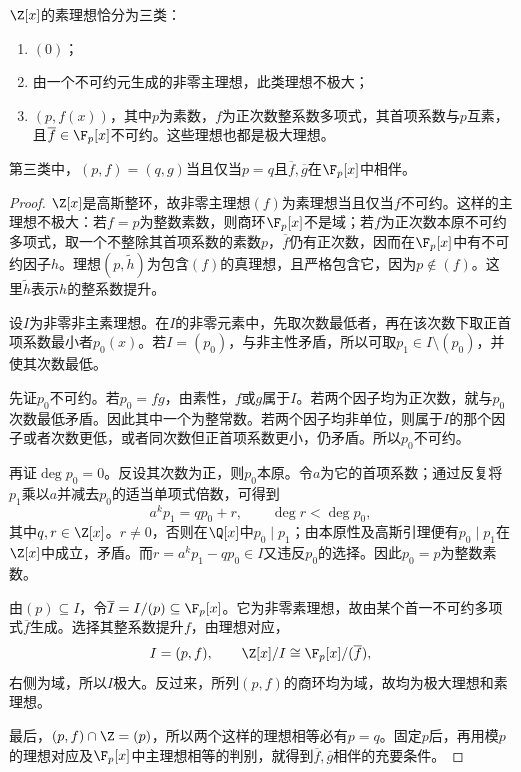 \begin{theorem}\label{p2:z-polynomial-primes}
$\Z[x]$的素理想恰分为三类：
\begin{enumerate}
\item $(0)$；
\item 由一个不可约元生成的非零主理想，此类理想不极大；
\item $(p,f(x))$，其中$p$为素数，$f$为正次数整系数多项式，其首项系数与$p$互素，且$\overline f\in\F_p[x]$不可约。这些理想也都是极大理想。
\end{enumerate}
第三类中，$(p,f)=(q,g)$当且仅当$p=q$且$\overline f,\overline g$在$\F_p[x]$中相伴。
\end{theorem}
\begin{proof}
$\Z[x]$是高斯整环，故非零主理想$(f)$为素理想当且仅当$f$不可约。这样的主理想不极大：若$f=p$为整数素数，则商环$\F_p[x]$不是域；若$f$为正次数本原不可约多项式，取一个不整除其首项系数的素数$p$，$\overline f$仍有正次数，因而在$\F_p[x]$中有不可约因子$h$。理想$(p,\widetilde h)$为包含$(f)$的真理想，且严格包含它，因为$p\notin(f)$。这里$\widetilde h$表示$h$的整系数提升。

设$I$为非零非主素理想。在$I$的非零元素中，先取次数最低者，再在该次数下取正首项系数最小者$p_0(x)$。若$I=(p_0)$，与非主性矛盾，所以可取$p_1\in I\setminus(p_0)$，并使其次数最低。

先证$p_0$不可约。若$p_0=fg$，由素性，$f$或$g$属于$I$。若两个因子均为正次数，就与$p_0$次数最低矛盾。因此其中一个为整常数。若两个因子均非单位，则属于$I$的那个因子或者次数更低，或者同次数但正首项系数更小，仍矛盾。所以$p_0$不可约。

再证$\deg p_0=0$。反设其次数为正，则$p_0$本原。令$a$为它的首项系数；通过反复将$p_1$乘以$a$并减去$p_0$的适当单项式倍数，可得到
\[
a^kp_1=qp_0+r,\qquad \deg r<\deg p_0,
\]
其中$q,r\in\Z[x]$。$r\ne0$，否则在$\Q[x]$中$p_0\mid p_1$；由本原性及高斯引理便有$p_0\mid p_1$在$\Z[x]$中成立，矛盾。而$r=a^kp_1-qp_0\in I$又违反$p_0$的选择。因此$p_0=p$为整数素数。

由$(p)\subseteq I$，令$\overline I=I/(p)\subseteq\F_p[x]$。它为非零素理想，故由某个首一不可约多项式$\overline f$生成。选择其整系数提升$f$，由理想对应，
\[
I=(p,f),\qquad
\Z[x]/I\cong\F_p[x]/(\overline f),
\]
右侧为域，所以$I$极大。反过来，所列$(p,f)$的商环均为域，故均为极大理想和素理想。

最后，$(p,f)\cap\Z=(p)$，所以两个这样的理想相等必有$p=q$。固定$p$后，再用模$p$的理想对应及$\F_p[x]$中主理想相等的判别，就得到$\overline f,\overline g$相伴的充要条件。
\end{proof}
